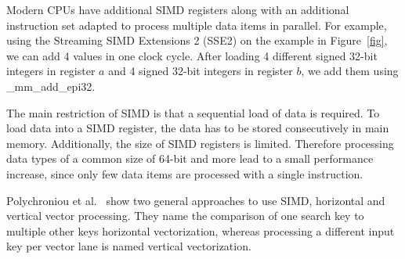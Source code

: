 \documentclass[runningheads,a4paper]{llncs}
\begin{document}
Modern CPUs have additional SIMD registers along with an additional instruction set adapted to process multiple data items in parallel. %
For example, using the Streaming SIMD Extensions 2 (SSE2) on the example in Figure~\ref{fig}, we can add 4 values in one clock cycle.
After loading 4 different signed 32-bit integers in register $a$ and 4 signed 32-bit integers in register $b$, we add them using \_mm\_add\_epi32. %

The main restriction of SIMD is that a sequential load of data is required. To load data into a SIMD register, the data has to be stored consecutively in main memory. Additionally, the size of SIMD registers is limited. Therefore processing data types of a common size of 64-bit and more lead to a small performance increase, since only few data items are processed with a single instruction.

Polychroniou et al.\ \cite{polychroniou2015rethinking} show two general approaches to use SIMD, horizontal and vertical vector processing. They name the comparison of one search key to multiple other keys horizontal vectorization, whereas processing a different input key per vector lane is named vertical vectorization.
\end{document}
